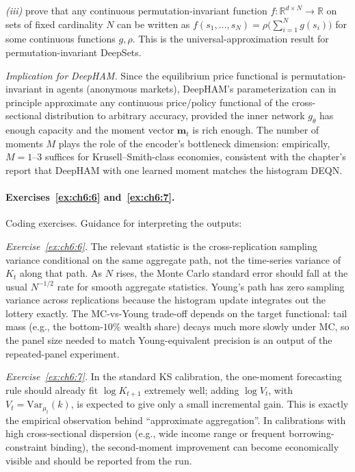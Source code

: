 \documentclass[11pt,a4paper]{report}
\begin{document}
\emph{(iii)} \citet{zaheer2017deep} prove that any continuous permutation-invariant function $f: \mathbb{R}^{d \times N} \to \mathbb{R}$ on sets of fixed cardinality $N$ can be written as $f(s_1, \dots, s_N) = \rho\bigl(\sum_{i=1}^N g(s_i)\bigr)$ for some continuous functions $g, \rho$.  This is the universal-approximation result for permutation-invariant DeepSets.

\emph{Implication for DeepHAM.}  Since the equilibrium price functional is permutation-invariant in agents (anonymous markets), DeepHAM's parameterization can in principle approximate any continuous price/policy functional of the cross-sectional distribution to arbitrary accuracy, provided the inner network $g_\theta$ has enough capacity and the moment vector $\bm m_t$ is rich enough.  The number of moments $M$ plays the role of the encoder's bottleneck dimension: empirically, $M = 1$--$3$ suffices for Krusell--Smith-class economies, consistent with the chapter's report that DeepHAM with one learned moment matches the histogram DEQN.

\paragraph{Exercises~\ref{ex:ch6:6} and~\ref{ex:ch6:7}.}
Coding exercises.  Guidance for interpreting the outputs:

\emph{Exercise~\ref{ex:ch6:6}.}  The relevant statistic is the cross-replication sampling variance conditional on the same aggregate path, not the time-series variance of $K_t$ along that path.  As $N$ rises, the Monte Carlo standard error should fall at the usual $N^{-1/2}$ rate for smooth aggregate statistics.  Young's path has zero sampling variance across replications because the histogram update integrates out the lottery exactly.  The MC-vs-Young trade-off depends on the target functional: tail mass (e.g., the bottom-$10\%$ wealth share) decays much more slowly under MC, so the panel size needed to match Young-equivalent precision is an output of the repeated-panel experiment.

\emph{Exercise~\ref{ex:ch6:7}.}  In the standard KS calibration, the one-moment forecasting rule should already fit $\log K_{t+1}$ extremely well; adding $\log V_t$, with $V_t=\mathrm{Var}_{\mu_t}(k)$, is expected to give only a small incremental gain.  This is exactly the empirical observation behind ``approximate aggregation''.  In calibrations with high cross-sectional dispersion (e.g., wide income range or frequent borrowing-constraint binding), the second-moment improvement can become economically visible and should be reported from the run.
\end{document}
